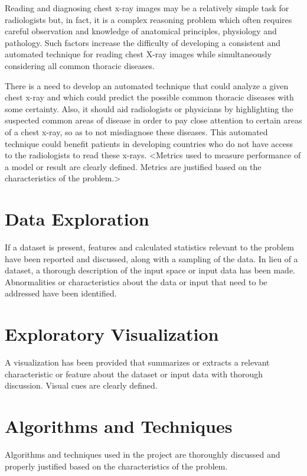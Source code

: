 \documentclass{article}
\begin{document}
    Reading and diagnosing chest x-ray images may be a relatively simple task for radiologists but, in fact, it is a complex reasoning problem which often requires careful observation and knowledge of anatomical principles, physiology and pathology. Such factors increase the difficulty of developing a consistent and automated technique for reading chest X-ray images while simultaneously considering all common thoracic diseases.\cite{nih-gov-xray-release}

    There is a need to develop an automated technique that could analyze a given chest x-ray and which could predict the possible common thoracic diseases with some certainty. Also, it should aid radiologists or physicians by highlighting the suspected common areas of disease in order to pay close attention to certain areas of a chest x-ray, so as to not misdiagnose these diseases. This automated technique could benefit patients in developing countries who do not have access to the radiologists to read these x-rays.
    <Metrics used to measure performance of a model or result are clearly defined. Metrics are justified based on the characteristics of the problem.>

    \section{Data Exploration}
    If a dataset is present, features and calculated statistics relevant to the problem have been reported and discussed, along with a sampling of the data. In lieu of a dataset, a thorough description of the input space or input data has been made. Abnormalities or characteristics about the data or input that need to be addressed have been identified.

    \section{Exploratory Visualization}
    A visualization has been provided that summarizes or extracts a relevant characteristic or feature about the dataset or input data with thorough discussion. Visual cues are clearly defined.

    \section{Algorithms and Techniques}
    Algorithms and techniques used in the project are thoroughly discussed and properly justified based on the characteristics of the problem.
\end{document}
